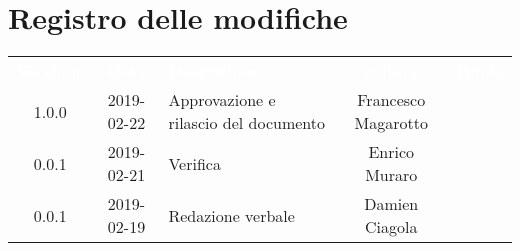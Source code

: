 \section*{Registro delle modifiche}
{
	\renewcommand{\arraystretch}{1.5}
	\centering
	\begin{longtable}{ c c  C{4cm}  c  c }
		
		\textcolor{white}{\textbf{Versione}} & \textcolor{white}{\textbf{Data}} & \textcolor{white}{\textbf{Descrizione}} & \textcolor{white}{\textbf{Autore}} & \textcolor{white}{\textbf{Ruolo}}\\
		1.0.0 & 2019-02-22 & Approvazione e rilascio del documento & Francesco Magarotto & \Res{} \\
		0.0.1 & 2019-02-21 & Verifica & Enrico Muraro & \ver{}\\
		0.0.1 & 2019-02-19 & Redazione verbale & Damien Ciagola & \reda{}\\
		
		
	\end{longtable}
	
}